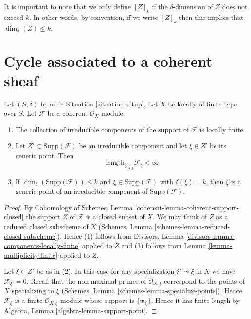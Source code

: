 \noindent
It is important to note that we only define $[Z]_k$ if the $\delta$-dimension
of $Z$ does not exceed $k$. In other words, by convention, if we write
$[Z]_k$ then this implies that $\dim_\delta(Z) \leq k$.



\section{Cycle associated to a coherent sheaf}
\label{section-cycle-of-coherent-sheaf}



\begin{lemma}
\label{lemma-length-finite}
Let $(S, \delta)$ be as in Situation \ref{situation-setup}.
Let $X$ be locally of finite type over $S$.
Let $\mathcal{F}$ be a coherent $\mathcal{O}_X$-module.
\begin{enumerate}
\item The collection of irreducible components of the support of
$\mathcal{F}$ is locally finite.
\item Let $Z' \subset \text{Supp}(\mathcal{F})$
be an irreducible component and
let $\xi \in Z'$ be its generic point.
Then
$$
\text{length}_{\mathcal{O}_{X, \xi}} \mathcal{F}_\xi < \infty
$$
\item If $\dim_\delta(\text{Supp}(\mathcal{F})) \leq k$
and $\xi \in \text{Supp}(\mathcal{F})$ with $\delta(\xi) = k$, then $\xi$ is a
generic point of an irreducible component of $\text{Supp}(\mathcal{F})$.
\end{enumerate}
\end{lemma}

\begin{proof}
By Cohomology of Schemes, Lemma \ref{coherent-lemma-coherent-support-closed}
the support $Z$ of $\mathcal{F}$ is a closed subset of $X$.
We may think of $Z$ as a reduced closed subscheme of $X$
(Schemes, Lemma \ref{schemes-lemma-reduced-closed-subscheme}).
Hence (1) follows from
Divisors, Lemma \ref{divisors-lemma-components-locally-finite} applied to $Z$
and (3) follows from
Lemma \ref{lemma-multiplicity-finite} applied to $Z$.

\medskip\noindent
Let $\xi \in Z'$ be as in (2). In this case for any specialization
$\xi' \leadsto \xi$ in $X$ we have $\mathcal{F}_{\xi'} = 0$.
Recall that the non-maximal primes of $\mathcal{O}_{X, \xi}$ correspond
to the points of $X$ specializing to $\xi$
(Schemes, Lemma \ref{schemes-lemma-specialize-points}).
Hence $\mathcal{F}_\xi$ is a finite $\mathcal{O}_{X, \xi}$-module
whose support is $\{\mathfrak m_\xi\}$. Hence it has finite length
by Algebra, Lemma \ref{algebra-lemma-support-point}.
\end{proof}

